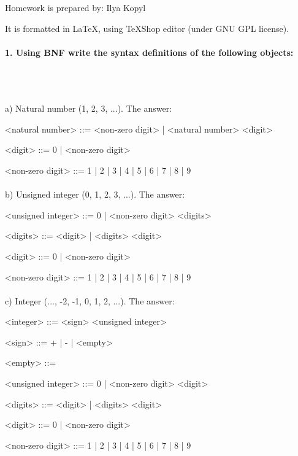 \documentclass{article}
\begin{document}
Homework is prepared by: Ilya Kopyl

It is formatted in LaTeX, using TeXShop editor (under GNU GPL license).


	\setlength{\grammarparsep}{5pt plus 1pt minus 1pt} %
	\setlength{\grammarindent}{12em} %




	\paragraph{1. Using BNF write the syntax definitions of the following objects:}\
	\rmfamily\\\
	
			a) Natural number (1, 2, 3, ...). The answer:
	\ttfamily
	\begin{grammar}
	
		<natural number> ::= <non-zero digit> | <natural number> <digit>

		<digit> ::= 0 | <non-zero digit>

		<non-zero digit> ::= 1 | 2 | 3 | 4 | 5 | 6 | 7 | 8 | 9
		
	\end{grammar}
	
	

	
	\paragraph{}
	\rmfamily
	
			b) Unsigned integer (0, 1, 2, 3, ...). The answer:
	\ttfamily
	\begin{grammar}
		
		<unsigned integer> ::= 0 | <non-zero digit> <digits>
		
		<digits> ::= <digit> | <digits> <digit>

		<digit> ::= 0 | <non-zero digit>

		<non-zero digit> ::= 1 | 2 | 3 | 4 | 5 | 6 | 7 | 8 | 9
		
	\end{grammar}




	\paragraph{}
	\rmfamily
	
			c) Integer (..., -2, -1, 0, 1, 2, ...). The answer:
	\ttfamily
	\begin{grammar}
		
		<integer> ::= <sign> <unsigned integer>
		
		<sign> ::= + | - | <empty>
		
		<empty> ::= \
		
		<unsigned integer> ::= 0 | <non-zero digit> <digit>
				
		<digits> ::= <digit> | <digits> <digit>

		<digit> ::= 0 | <non-zero digit>
		
		<non-zero digit> ::= 1 | 2 | 3 | 4 | 5 | 6 | 7 | 8 | 9

		
	\end{grammar}
\end{document}
